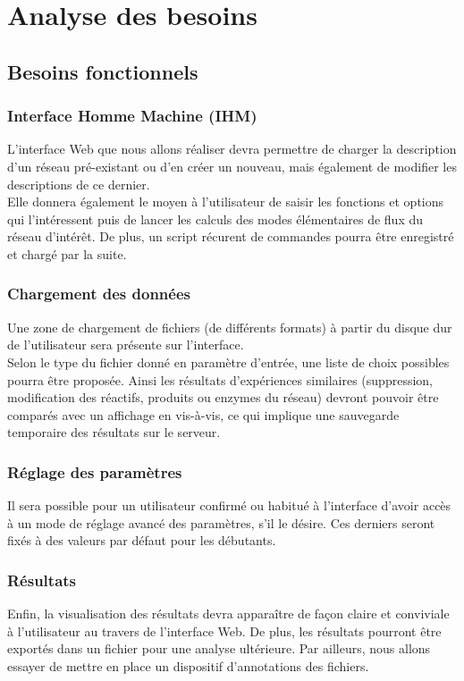 \section{Analyse des besoins}

\subsection{Besoins fonctionnels}

\subsubsection{Interface Homme Machine (IHM)}
L'interface Web que nous allons réaliser devra permettre de charger la description d'un réseau pré-existant ou d'en créer un nouveau, mais également de modifier les descriptions de ce dernier.\\
Elle donnera également le moyen à l'utilisateur de saisir les fonctions et options qui l'intéressent puis de lancer les calculs des modes élémentaires de flux du réseau d'intérêt. De plus, un script récurent de commandes pourra être enregistré et chargé par la suite.

\subsubsection{Chargement des données}
Une zone de chargement de fichiers (de différents formats) à partir du disque dur de l'utilisateur sera présente sur l'interface. \\
Selon le type du fichier donné en paramètre d'entrée, une liste de choix possibles pourra être proposée. Ainsi les résultats d'expériences similaires (suppression, modification des réactifs, produits ou enzymes du réseau) devront pouvoir être comparés avec un affichage en vis-à-vis, ce qui implique une sauvegarde temporaire des résultats sur le serveur. 

\subsubsection{Réglage des paramètres}
Il sera possible pour un utilisateur confirmé ou habitué à l'interface d'avoir accès à un mode de réglage avancé des paramètres, s'il le désire. Ces derniers seront fixés à des valeurs par défaut pour les débutants. 

\subsubsection{Résultats}
Enfin, la visualisation des résultats devra apparaître de façon claire et conviviale à l'utilisateur au travers de l'interface Web. De plus, les résultats pourront être exportés dans un fichier pour une analyse ultérieure. Par ailleurs, nous allons essayer de mettre en place un dispositif d'annotations des fichiers.

